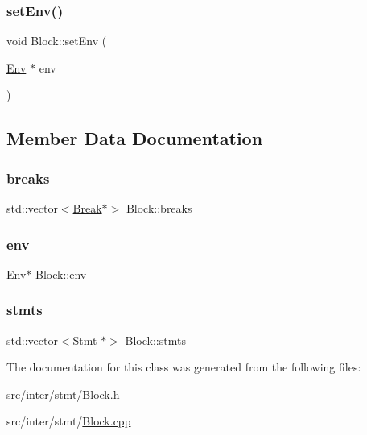 \subsubsection{\texorpdfstring{set\+Env()}{setEnv()}}
{\footnotesize\ttfamily void Block\+::set\+Env (\begin{DoxyParamCaption}\item[{\hyperlink{class_env}{Env} $\ast$}]{env }\end{DoxyParamCaption})}



\subsection{Member Data Documentation}
\mbox{\label{class_block_a8cdf287fcbcf92cc429c78b79464b363}} 
\subsubsection{\texorpdfstring{breaks}{breaks}}
{\footnotesize\ttfamily std\+::vector$<$\hyperlink{class_break}{Break}$\ast$$>$ Block\+::breaks}

\mbox{\label{class_block_a85617f1e8f9f4b998e9b1ebc4c3b37c4}} 
\subsubsection{\texorpdfstring{env}{env}}
{\footnotesize\ttfamily \hyperlink{class_env}{Env}$\ast$ Block\+::env\hspace{0.3cm}{\ttfamily [protected]}}

\mbox{\label{class_block_a88f627f956bdc80d9d697f0755130d34}} 
\subsubsection{\texorpdfstring{stmts}{stmts}}
{\footnotesize\ttfamily std\+::vector$<$\hyperlink{class_stmt}{Stmt} $\ast$$>$ Block\+::stmts\hspace{0.3cm}{\ttfamily [protected]}}



The documentation for this class was generated from the following files\+:\begin{DoxyCompactItemize}
\item 
src/inter/stmt/\hyperlink{_block_8h}{Block.\+h}\item 
src/inter/stmt/\hyperlink{_block_8cpp}{Block.\+cpp}\end{DoxyCompactItemize}
